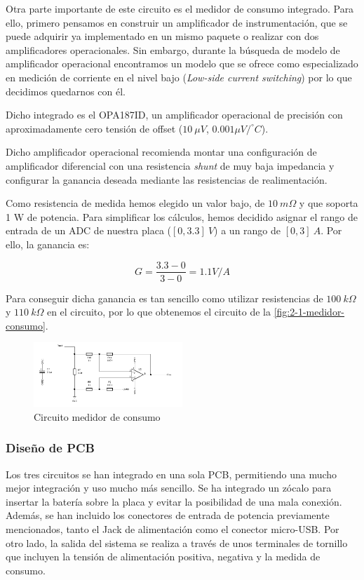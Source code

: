 Otra parte importante de este circuito es el medidor de consumo integrado. Para ello, primero pensamos en construir un amplificador de instrumentación, que se puede adquirir ya implementado en un mismo paquete o realizar con dos amplificadores operacionales. Sin embargo, durante la búsqueda de modelo de amplificador operacional encontramos un modelo que se ofrece como especializado en medición de corriente en el nivel bajo (\textit{Low-side current switching}) por lo que decidimos quedarnos con él.

Dicho integrado es el OPA187ID, un amplificador operacional de precisión con aproximadamente cero tensión de offset ($10\ \mu V$, $0.001\mu V/^\circ\! C$). \cite{OPA187DataSheet}

Dicho amplificador operacional recomienda montar una configuración de amplificador diferencial con una resistencia \textit{shunt} de muy baja impedancia y configurar la ganancia deseada mediante las resistencias de realimentación.

Como resistencia de medida hemos elegido un valor bajo, de $10\ m\Omega$ y que soporta 1 W de potencia. Para simplificar los cálculos, hemos decidido asignar el rango de entrada de un ADC de nuestra placa ($[0, 3.3]\ V$) a un rango de $[0, 3]\ A$. Por ello, la ganancia es:

\[
    G = \frac{3.3 - 0}{3 - 0} = 1.1 V/A  
\]

Para conseguir dicha ganancia es tan sencillo como utilizar resistencias de $100\ k\Omega$ y $110\ k\Omega$ en el circuito, por lo que obtenemos el circuito de la \autoref{fig:2-1-medidor-consumo}.

\begin{figure}[h]
    \centering
    \includegraphics[width=0.5\textwidth]{images/2/2-1/circuitoConsumo.png}
    \caption{Circuito medidor de consumo}
    \label{fig:2-1-medidor-consumo}
\end{figure}

\subsubsection{Diseño de PCB}

Los tres circuitos se han integrado en una sola PCB, permitiendo una mucho mejor integración y uso mucho más sencillo. Se ha integrado un zócalo para insertar la batería sobre la placa y evitar la posibilidad de una mala conexión. Además, se han incluido los conectores de entrada de potencia previamente mencionados, tanto el Jack de alimentación como el conector micro-USB. Por otro lado, la salida del sistema se realiza a través de unos terminales de tornillo que incluyen la tensión de alimentación positiva, negativa y la medida de consumo.

